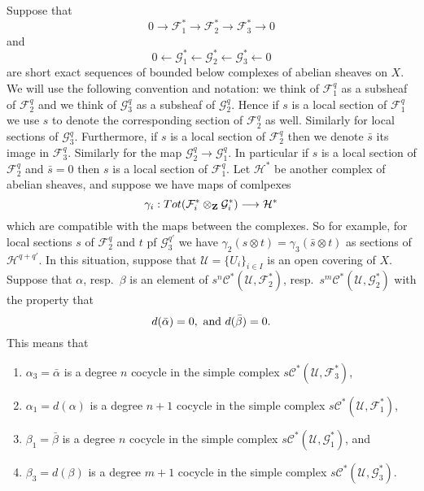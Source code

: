 \medskip\noindent
Suppose that
$$
0
\to
{\mathcal F}_1^*
\to
{\mathcal F}_2^*
\to
{\mathcal F}_3^*
\to
0
$$
and
$$
0
\leftarrow
{\mathcal G}_1^*
\leftarrow
{\mathcal G}_2^*
\leftarrow
{\mathcal G}_3^*
\leftarrow
0
$$
are short exact sequences of bounded below complexes of abelian
sheaves on $X$. We will use the following convention and notation: we think of
${\mathcal F}_1^q$ as a subsheaf of ${\mathcal F}_2^q$ and we think of
${\mathcal G}_3^q$ as a subsheaf of ${\mathcal G}_2^q$. Hence if $s$ is
a local section of ${\mathcal F}_1^q$ we use $s$ to denote
the corresponding section of ${\mathcal F}_2^q$ as well. Similarly
for local sections of ${\mathcal G}_3^q$. Furthermore,
if $s$ is a local section of ${\mathcal F}_2^q$ then we denote
$\bar s$ its image in ${\mathcal F}_3^q$. Similarly for the
map ${\mathcal G}_2^q \to {\mathcal G}^q_1$. In particular if
$s$ is a local section of ${\mathcal F}_2^q$ and $\bar s = 0$
then $s$ is a local section of ${\mathcal F}_1^q$. Let ${\mathcal H}^*$
be another complex of abelian sheaves, and suppose
we have maps of comlpexes
$$
\gamma_i :
Tot({\mathcal F}_i^* \otimes_{\bf Z} {\mathcal G}_i^*)
\longrightarrow
{\mathcal H}^*
$$
which are compatible with the maps between the complexes. So for
example, for local sections $s$ of ${\mathcal F}_2^q$ and
$t$ pf ${\mathcal G}_3^{q'}$ we have $\gamma_2(s\otimes t)
= \gamma_3(\bar s \otimes t)$ as sections of ${\mathcal H}^{q + q'}$.
In this situation, suppose that ${\mathcal U} = \{ U_i \}_{i\in I}$
is an open covering of $X$. Suppose that $\alpha$, resp.\ 
$\beta$ is an element of $s^n{\mathcal C}^*({\mathcal U}, {\mathcal F}_2^*)$,
resp.\ $s^m{\mathcal C}^*({\mathcal U}, {\mathcal G}_2^*)$ with the
property that
$$
d(\bar \alpha) = 0, \ \hbox{and}\ d(\bar \beta) = 0.
$$
This means that
\begin{enumerate}
\item $\alpha_3 = \bar \alpha$ is a degree $n$ cocycle
in the simple complex $s{\mathcal C}^*({\mathcal U}, {\mathcal F}_3^*)$,
\item $\alpha_1 = d(\alpha)$ is a degree $n + 1$
cocycle in the simple complex
$s{\mathcal C}^*({\mathcal U}, {\mathcal F}_1^*)$,
\item $\beta_1 = \bar \beta$ is a degree $n$ cocycle
in the simple complex
$s{\mathcal C}^*({\mathcal U}, {\mathcal G}_1^*)$, and
\item $\beta_3 = d(\beta)$ is a degree $m + 1$
cocycle in the simple complex
$s{\mathcal C}^*({\mathcal U}, {\mathcal G}_3^*)$.
\end{enumerate}

